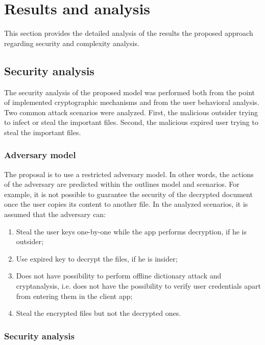 \documentclass[twocolumn]{svjour3}          	%
\begin{document}
\section{Results and analysis}
\label{sec_results}

This section provides the detailed analysis of the results the proposed approach regarding security and complexity analysis.

\subsection{Security analysis}
\label{sec_sec_analysis}
The security analysis of the proposed model was performed both from the point of implemented cryptographic mechanisms and from the user behavioral analysis. Two common attack scenarios were analyzed. First, the malicious outsider trying to infect or steal the important files. Second, the malicious expired user trying to steal the important files. 

\subsubsection{Adversary model}
\label{sec_adversary_model}
The proposal is to use a restricted adversary model. In other words, the actions of the adversary are predicted within the outlines model and scenarios. For example, it is not possible to guarantee the security of the decrypted document once the user copies its content to another file. In the analyzed scenarios, it is assumed that the adversary can:

\begin{enumerate}
	\item Steal the user keys one-by-one while the app performs decryption, if he is outsider;
	\item Use expired key to decrypt the files, if he is insider;
	\item Does not have possibility to perform offline dictionary attack and cryptanalysis, i.e. does not have the possibility to verify user credentials apart from entering them in the client app;
	\item Steal the encrypted files but not the decrypted ones.
\end{enumerate}

\subsubsection{Security analysis}
\label{sec_sec_analysis}
\end{document}
